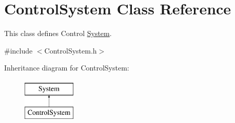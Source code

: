 \hypertarget{class_control_system}{}\section{Control\+System Class Reference}
\label{class_control_system}


This class defines Control \mbox{\hyperlink{class_system}{System}}.  




{\ttfamily \#include $<$Control\+System.\+h$>$}

Inheritance diagram for Control\+System\+:\begin{figure}[H]
\begin{center}
\leavevmode
\includegraphics[height=2.000000cm]{class_control_system}
\end{center}
\end{figure}
